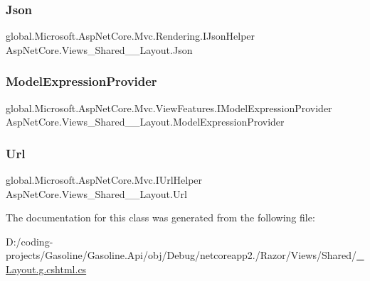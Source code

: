 \subsubsection{\texorpdfstring{Json}{Json}}
{\footnotesize\ttfamily global.\+Microsoft.\+Asp\+Net\+Core.\+Mvc.\+Rendering.\+I\+Json\+Helper Asp\+Net\+Core.\+Views\+\_\+\+Shared\+\_\+\+\_\+\+Layout.\+Json\hspace{0.3cm}{\ttfamily [get]}}

\mbox{\label{class_asp_net_core_1_1_views___shared_____layout_aac460ec4de4ed34a70fba1f432e30177}} 
\subsubsection{\texorpdfstring{ModelExpressionProvider}{ModelExpressionProvider}}
{\footnotesize\ttfamily global.\+Microsoft.\+Asp\+Net\+Core.\+Mvc.\+View\+Features.\+I\+Model\+Expression\+Provider Asp\+Net\+Core.\+Views\+\_\+\+Shared\+\_\+\+\_\+\+Layout.\+Model\+Expression\+Provider\hspace{0.3cm}{\ttfamily [get]}}

\mbox{\label{class_asp_net_core_1_1_views___shared_____layout_a6c45fa86aef386a351f71fe9e747c871}} 
\subsubsection{\texorpdfstring{Url}{Url}}
{\footnotesize\ttfamily global.\+Microsoft.\+Asp\+Net\+Core.\+Mvc.\+I\+Url\+Helper Asp\+Net\+Core.\+Views\+\_\+\+Shared\+\_\+\+\_\+\+Layout.\+Url\hspace{0.3cm}{\ttfamily [get]}}



The documentation for this class was generated from the following file\+:\begin{DoxyCompactItemize}
\item 
D\+:/coding-\/projects/\+Gasoline/\+Gasoline.\+Api/obj/\+Debug/netcoreapp2./\+Razor/\+Views/\+Shared/\mbox{\hyperlink{___layout_8g_8cshtml_8cs}{\+\_\+\+Layout.\+g.\+cshtml.\+cs}}\end{DoxyCompactItemize}
